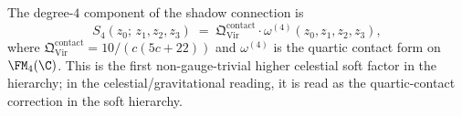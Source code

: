 \begin{theorem}
\label{thm:gravity-quartic-soft}
The degree-$4$ component of the shadow connection is
\begin{equation}\label{eq:gravity-S4}
S_4(z_0;\, z_1, z_2, z_3)
\;=\;
\mathfrak{Q}^{\mathrm{contact}}_{\mathrm{Vir}}
\cdot
\omega^{(4)}(z_0, z_1, z_2, z_3),
\end{equation}
where $\mathfrak{Q}^{\mathrm{contact}}_{\mathrm{Vir}}
= 10/(c(5c+22))$ and $\omega^{(4)}$ is the quartic contact
form on $\FM_4(\C)$. This is the first non-gauge-trivial higher
celestial soft factor in the hierarchy; in the
celestial/gravitational reading, it is read as the quartic-contact
correction in the soft hierarchy.
\end{theorem}

